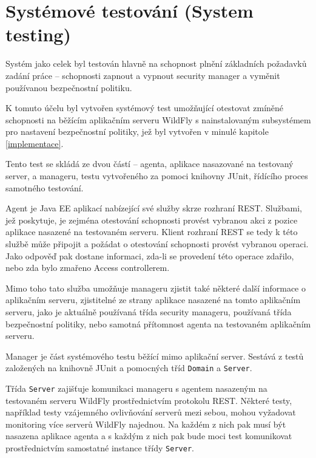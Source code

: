 \section{Systémové testování (System testing)}

Systém jako celek byl testován hlavně na schopnost plnění základních požadavků zadání práce -- schopnosti zapnout a vypnout security manager a vyměnit používanou bezpečnostní politiku.

K tomuto účelu byl vytvořen systémový test umožňující otestovat zmíněné schopnosti na běžícím aplikačním serveru WildFly s nainstalovaným subsystémem pro nastavení bezpečnostní politiky, jež byl vytvořen v minulé kapitole \ref{implementace}.

Tento test se skládá ze dvou částí -- agenta, aplikace nasazované na testovaný server, a manageru, testu vytvořeného za pomoci knihovny JUnit, řídícího proces samotného testování.

Agent je Java EE aplikací nabízející své služby skrze rozhraní REST. Službami, jež poskytuje, je zejména otestování schopnosti provést vybranou akci z pozice aplikace nasazené na testovaném serveru. Klient rozhraní REST se tedy k této službě může připojit a požádat o otestování schopnosti provést vybranou operaci. Jako odpověď pak dostane informaci, zda-li se provedení této operace zdařilo, nebo zda bylo zmařeno Access controllerem.

Mimo toho tato služba umožňuje manageru zjistit také některé další informace o aplikačním serveru, zjistitelné ze strany aplikace nasazené na tomto aplikačním serveru, jako je aktuálně používaná třída security manageru, používaná třída bezpečnostní politiky, nebo samotná přítomnost agenta na testovaném aplikačním serveru.

Manager je část systémového testu běžící mimo aplikační server. Sestává z testů založených na knihovně JUnit a pomocných tříd {\tt Domain} a {\tt Server}.

Třída {\tt Server} zajišťuje komunikaci manageru s agentem nasazeným na testovaném serveru WildFly prostřednictvím protokolu REST. Některé testy, například testy vzájemného ovlivňování serverů mezi sebou, mohou vyžadovat monitoring více serverů WildFly najednou. Na každém z nich pak musí být nasazena aplikace agenta a s každým z nich pak bude moci test komunikovat prostřednictvím samostatné instance třídy {\tt Server}.

